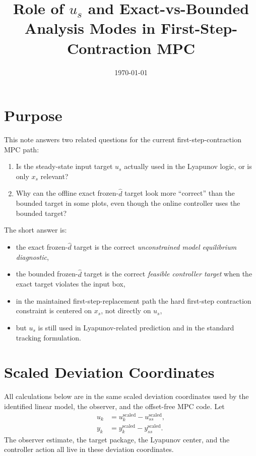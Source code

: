 \documentclass[11pt]{article}
\title{Role of $u_s$ and Exact-vs-Bounded Analysis Modes in First-Step-Contraction MPC}
\author{}
\date{\today}
\begin{document}
\maketitle

\section{Purpose}

This note answers two related questions for the current first-step-contraction MPC path:
\begin{enumerate}
\item Is the steady-state input target $u_s$ actually used in the Lyapunov logic, or is only $x_s$ relevant?
\item Why can the offline exact frozen-$\hat d$ target look more ``correct'' than the bounded target in some plots, even though the online controller uses the bounded target?
\end{enumerate}

The short answer is:
\begin{itemize}
\item the exact frozen-$\hat d$ target is the correct \emph{unconstrained model equilibrium diagnostic},
\item the bounded frozen-$\hat d$ target is the correct \emph{feasible controller target} when the exact target violates the input box,
\item in the maintained first-step-replacement path the hard first-step contraction constraint is centered on $x_s$, not directly on $u_s$,
\item but $u_s$ is still used in Lyapunov-related prediction and in the standard tracking formulation.
\end{itemize}

\section{Scaled Deviation Coordinates}

All calculations below are in the same scaled deviation coordinates used by the identified linear model, the observer, and the offset-free MPC code. Let
\begin{align}
u_k &= u_k^{\mathrm{scaled}} - u_{ss}^{\mathrm{scaled}}, \\
y_k &= y_k^{\mathrm{scaled}} - y_{ss}^{\mathrm{scaled}}.
\end{align}
The observer estimate, the target package, the Lyapunov center, and the controller action all live in these deviation coordinates.
\end{document}
